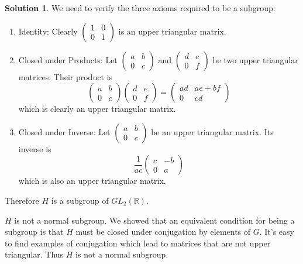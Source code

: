 \documentclass[12pt]{article}
\theoremstyle{definition}
\theoremstyle{definition}
\newtheorem{solution}{Solution}
\newcommand{\R}{\mathbb{R}}
\begin{document}
\begin{solution}
We need to verify the three axioms required to be a subgroup:
\begin{enumerate}
	\item Identity: Clearly $\begin{pmatrix} 1 & 0 \\ 0 & 1 \end{pmatrix}$ is an upper triangular matrix.
	\item Closed under Products: Let $\begin{pmatrix} a & b \\ 0 & c \end{pmatrix}$ and $\begin{pmatrix} d & e \\ 0 & f \end{pmatrix}$ be two upper triangular matrices. Their product is
	\begin{equation}
		\begin{pmatrix} a & b \\ 0 & c \end{pmatrix} \begin{pmatrix} d & e \\ 0 & f \end{pmatrix} =
		\begin{pmatrix}
		ad & ae + bf \\ 0 & cd
		\end{pmatrix}
	\end{equation}
	which is clearly an upper triangular matrix. 
	\item Closed under Inverse: Let $\begin{pmatrix} a & b \\ 0 & c \end{pmatrix}$ be an upper triangular matrix. Its inverse is
	\begin{equation}
		\frac{1}{ac} \begin{pmatrix} c & -b \\ 0 & a \end{pmatrix}
	\end{equation}
	which is also an upper triangular matrix.

\end{enumerate}
Therefore $H$ is a subgroup of $GL_2(\R)$.

$H$ is not a normal subgroup. We showed that an equivalent condition for being a subgroup is that $H$ must be closed under conjugation by elements of $G$. It's easy to find examples of conjugation which lead to matrices that are not upper triangular. Thus $H$ is not a normal subgroup. 
\end{solution}
\end{document}
